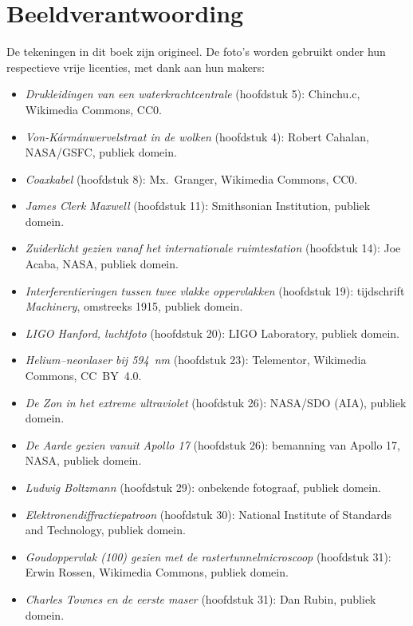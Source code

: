 \chapter*{Beeldverantwoording}

De tekeningen in dit boek zijn origineel. De foto's worden gebruikt
onder hun respectieve vrije licenties, met dank aan hun makers:

\begin{itemize}
  \item \emph{Drukleidingen van een waterkrachtcentrale}
        (hoofdstuk 5): Chinchu.c, Wikimedia Commons, CC0.
  \item \emph{Von-Kármánwervelstraat in de wolken} (hoofdstuk 4):
        Robert Cahalan, NASA/GSFC, publiek domein.
  \item \emph{Coaxkabel} (hoofdstuk 8): Mx.~Granger, Wikimedia
        Commons, CC0.
  \item \emph{James Clerk Maxwell} (hoofdstuk 11): Smithsonian
        Institution, publiek domein.
  \item \emph{Zuiderlicht gezien vanaf het internationale
        ruimtestation} (hoofdstuk 14): Joe Acaba, NASA, publiek
        domein.
  \item \emph{Interferentieringen tussen twee vlakke oppervlakken}
        (hoofdstuk 19): tijdschrift \emph{Machinery}, omstreeks 1915,
        publiek domein.
  \item \emph{LIGO Hanford, luchtfoto} (hoofdstuk 20): LIGO
        Laboratory, publiek domein.
  \item \emph{Helium--neonlaser bij 594~nm} (hoofdstuk 23):
        Telementor, Wikimedia Commons, CC~BY~4.0.
  \item \emph{De Zon in het extreme ultraviolet} (hoofdstuk 26):
        NASA/SDO (AIA), publiek domein.
  \item \emph{De Aarde gezien vanuit Apollo 17} (hoofdstuk 26):
        bemanning van Apollo 17, NASA, publiek domein.
  \item \emph{Ludwig Boltzmann} (hoofdstuk 29): onbekende fotograaf,
        publiek domein.
  \item \emph{Elektronendiffractiepatroon} (hoofdstuk 30): National
        Institute of Standards and Technology, publiek domein.
  \item \emph{Goudoppervlak (100) gezien met de
        rastertunnelmicroscoop} (hoofdstuk 31): Erwin Rossen,
        Wikimedia Commons, publiek domein.
  \item \emph{Charles Townes en de eerste maser} (hoofdstuk 31): Dan
        Rubin, publiek domein.
\end{itemize}

